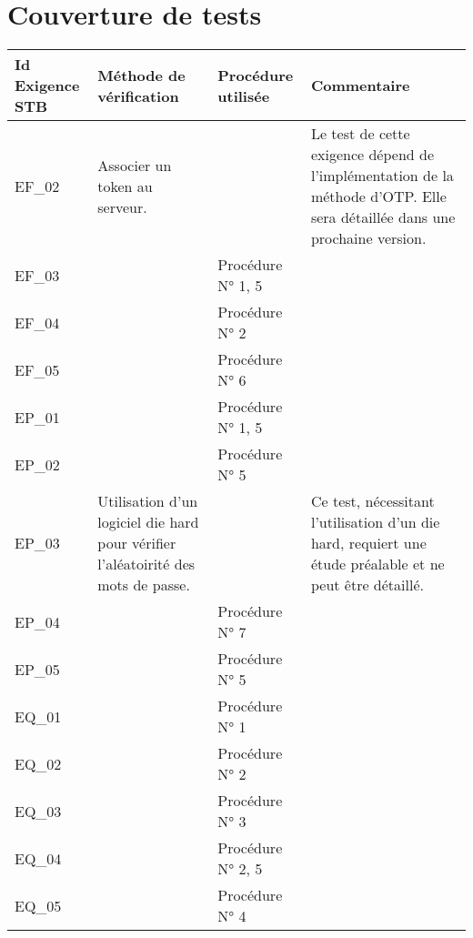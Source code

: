 \documentclass{"../../res/univ-projet"}
\begin{document}
  \section{Couverture de tests}
  \begin{center}
    \begin{tabular}{|p{3cm}|p{4cm}|p{3cm}|p{5cm}|}
      \hline
      Id Exigence STB & Méthode de vérification & Procédure utilisée & Commentaire\\ \hline
      EF\_02 & Associer un token au serveur. & 
      & Le test de cette exigence dépend de l'implémentation de la méthode d'OTP. Elle sera détaillée dans une prochaine version.\\ \hline
      EF\_03 & & Procédure N° 1, 5 & \\ \hline
      EF\_04 & & Procédure N° 2 & \\ \hline
      EF\_05 & & Procédure N° 6 & \\ \hline
      EP\_01 & & Procédure N° 1, 5 & \\ \hline
      EP\_02 & & Procédure N° 5 & \\ \hline
      EP\_03 & Utilisation d'un logiciel \og{}die hard\fg{} pour vérifier l'aléatoirité des mots de passe. &  
      & Ce test, nécessitant l'utilisation d'un \og{}die hard\fg{}, requiert une étude préalable et ne peut \^etre détaillé.\\ \hline
      EP\_04 & & Procédure N° 7 & \\ \hline
      EP\_05 & & Procédure N° 5 & \\ \hline
      EQ\_01 & & Procédure N° 1 & \\ \hline
      EQ\_02 & & Procédure N° 2 & \\ \hline
      EQ\_03 & & Procédure N° 3 & \\ \hline
      EQ\_04 & & Procédure N° 2, 5 & \\ \hline
      EQ\_05 & & Procédure N° 4 & \\ \hline
    \end{tabular}  
  \end{center}
\end{document}
